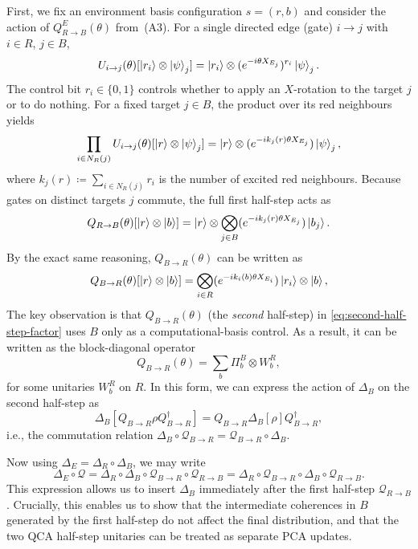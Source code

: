 First, we fix an environment basis configuration \(s = (r,b)\) and consider the action of \(Q_{R\to B}^E(\theta)\) from~(A3). For a single directed edge (gate) \(i \to j\) with \(i \in R\), \(j \in B\),
\begin{equation}\label{eq:single-i-single-j}
    U_{i\to j}(\theta)[\ket{r_i} \otimes \ket{\psi}_j] = \ket{r_i} \otimes (e^{-i\theta X_{E_j}})^{r_i} \ket{\psi}_j.
\end{equation}
The control bit \(r_i \in \{0,1\}\) controls whether to apply an \(X\)-rotation to the target \(j\) or to do nothing. For a fixed target \(j \in B\), the product over its red neighbours yields
\begin{equation}\label{eq:single-j}
    \prod_{i \in N_R(j)} U_{i\to j}(\theta)[\ket{r} \otimes \ket{\psi}_j] = \ket{r} \otimes (e^{-ik_j(r)\theta X_{E_j}}) \ket{\psi}_j,
\end{equation}
where \(k_j(r) \coloneq \sum_{i \in N_R(j)} r_i\) is the number of excited red neighbours. Because gates on distinct targets \(j\) commute, the full first half-step acts as
\begin{equation}\label{eq:first-half-step-factor}
    Q_{R\to B}(\theta)[\ket{r} \otimes \ket{b}] = \ket{r} \otimes \bigotimes_{j \in B} (e^{-ik_j(r)\theta X_{E_j}}) \ket{b_j}.
\end{equation}
By the exact same reasoning, \(Q_{B\to R}(\theta)\) can be written as
\begin{equation}\label{eq:second-half-step-factor}
    Q_{B\to R}(\theta)[\ket{r} \otimes \ket{b}] = \bigotimes_{i \in R} (e^{-ik_i(b)\theta X_{E_i}}) \ket{r_i} \otimes \ket{b},
\end{equation}
The key observation is that \(Q_{B\to R}(\theta)\) (the \emph{second} half-step) in \cref{eq:second-half-step-factor} uses \(B\) only as a computational-basis control. As a result, it can be written as the block-diagonal operator
\begin{equation}
    Q_{B\to R}(\theta) = \sum_b \Pi_b^B \otimes W^R_b,
\end{equation}
for some unitaries \(W_b^R\) on \(R\). In this form, we can express the action of \(\Delta_B\) on the second half-step as
\begin{equation}
    \Delta_B[Q_{B \to R} \rho Q_{B \to R}^\dagger] = Q_{B \to R} \Delta_B[\rho] Q_{B \to R}^\dagger,
\end{equation}
i.e., the commutation relation \(\Delta_B \circ \mathcal{Q}_{B \to R} = \mathcal{Q}_{B \to R} \circ \Delta_B\). 

Now using \(\Delta_E = \Delta_R \circ \Delta_B\), we may write
\begin{equation}\label{eq:maps-commutation}
    \Delta_E \circ \mathcal{Q} = \Delta_R \circ \Delta_B \circ \mathcal{Q}_{B \to R} \circ \mathcal{Q}_{R \to B} = \Delta_R \circ \mathcal{Q}_{B \to R} \circ \Delta_B \circ \mathcal{Q}_{R \to B}.
\end{equation}
This expression allows us to insert \(\Delta_B\) immediately after the first half-step \(\mathcal{Q}_{R \to B}\). Crucially, this enables us to show that the intermediate coherences in \(B\) generated by the first half-step do not affect the final distribution, and that the two QCA half-step unitaries can be treated as separate PCA updates.

